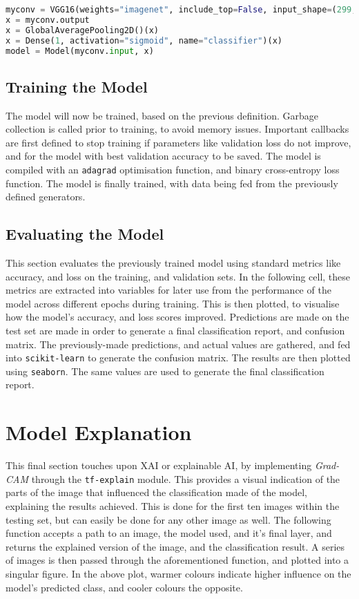 \documentclass[../main]{subfiles}
\begin{document}
\begin{lstlisting}[language=Python, caption=Python example]
myconv = VGG16(weights="imagenet", include_top=False, input_shape=(299, 299, 3))
x = myconv.output
x = GlobalAveragePooling2D()(x)
x = Dense(1, activation="sigmoid", name="classifier")(x)
model = Model(myconv.input, x)
\end{lstlisting}

\subsection{Training the Model}
The model will now be trained, based on the previous definition. Garbage
collection is called prior to training, to avoid memory issues. Important
callbacks are first defined to stop training if parameters like validation loss
do not improve, and for the model with best validation accuracy to be saved. The
model is compiled with an \texttt{adagrad} optimisation function, and binary
cross-entropy loss function. The model is finally trained, with data being fed
from the previously defined generators.

\subsection{Evaluating the Model}
This section evaluates the previously trained model using standard metrics like
accuracy, and loss on the training, and validation sets. In the following cell,
these metrics are extracted into variables for later use from the performance of
the model across different epochs during training. This is then plotted, to
visualise how the model's accuracy, and loss scores improved. Predictions are
made on the test set are made in order to generate a final classification
report, and confusion matrix. The previously-made predictions, and actual values
are gathered, and fed into \texttt{scikit-learn} to generate the confusion
matrix. The results are then plotted using \texttt{seaborn}. The same values are
used to generate the final classification report.
 
\section{Model Explanation}
This final section touches upon XAI or explainable AI, by implementing
\emph{Grad-CAM} through the \texttt{tf-explain} module. This provides a visual
indication of the parts of the image that influenced the classification made of
the model, explaining the results achieved. This is done for the first ten
images within the testing set, but can easily be done for any other image as
well. The following function accepts a path to an image, the model used, and
it's final layer, and returns the explained version of the image, and the
classification result. A series of images is then passed through the
aforementioned function, and plotted into a singular figure. In the above plot,
warmer colours indicate higher influence on the model's predicted class, and
cooler colours the opposite.
\end{document}
